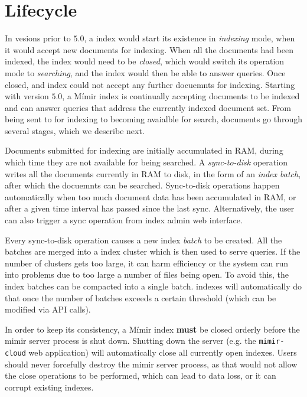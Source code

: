 \section{\Mimir{} Lifecycle}

In vesions prior to $5.0$, a \Mimir{} index would start its existence in {\em
indexing} mode, when it would accept new documents for indexing. When all the
documents had been indexed, the index would need to be {\em closed}, which would
switch its operation mode to {\em searching}, and the index would then be able
to answer queries. Once closed, and index could not accept any further docuemnts
for indexing. Starting with version $5.0$, a Mímir index is continually
accepting documents to be indexed and can answer queries that address the
currently indexed document set. From being sent to \Mimir{} for indexing to
becoming avaialble for search, documents go through several stages, which we
describe next.

Documents submitted for indexing are initially accumulated in RAM, during
which time they are not available for being searched. A {\em sync-to-disk}
operation writes all the documents currently in RAM to disk, in the form of an
{\em index batch}, after which the docuemnts can be searched. Sync-to-disk
operations happen automatically when too much document data has been accumulated
in RAM, or after a given time interval has passed since the last sync.
Alternatively, the user can also trigger a sync operation from index admin web
interface.

Every sync-to-disk operation causes a new index {\em batch} to be created.
All the batches are merged into a index cluster which is then used to serve
queries. If the number of clusters gets too large, it can harm efficiency or the
system can run into problems due to too large a number of files being open. To
avoid this, the index batches can be compacted into a single batch. \Mimir{}
indexes will automatically do that once the number of batches exceeds a certain
threshold (which can be modified via API calls).

In order to keep its consistency, a Mímir index {\bf must} be closed orderly
before the mimir server process is shut down. Shutting down the \Mimir{} server
(e.g. the {\tt mimir-cloud} web application) will automatically close all
currently open indexes. Users should never forcefully destroy the mimir server
process, as that would not allow the close operations to be performed, which can
lead to data loss, or it can corrupt existing indexes.